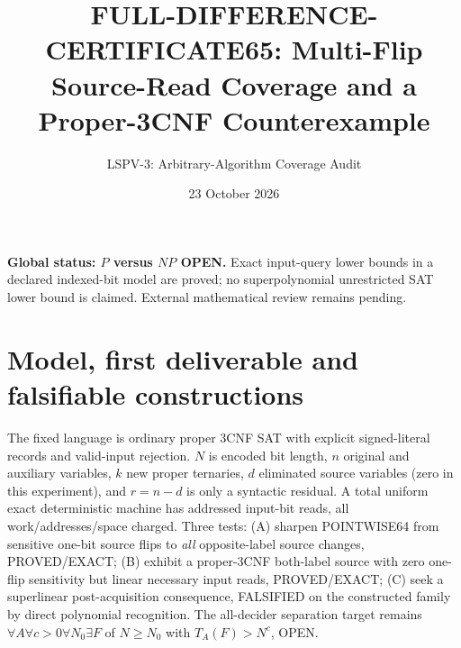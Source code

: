 \documentclass[10pt]{article}
\title{FULL-DIFFERENCE-CERTIFICATE65: Multi-Flip Source-Read Coverage and a Proper-3CNF Counterexample}
\author{LSPV-3: Arbitrary-Algorithm Coverage Audit}
\date{23 October 2026}
\begin{document}
\maketitle
\noindent\textbf{Global status: $P$ versus $NP$ OPEN.} Exact input-query lower bounds in a declared indexed-bit model are proved; no superpolynomial unrestricted SAT lower bound is claimed. External mathematical review remains pending.

\section{Model, first deliverable and falsifiable constructions}
The fixed language is ordinary proper 3CNF SAT with explicit signed-literal records and valid-input rejection. $N$ is encoded bit length, $n$ original and auxiliary variables, $k$ new proper ternaries, $d$ eliminated source variables (zero in this experiment), and $r=n-d$ is only a syntactic residual. A total uniform exact deterministic machine has addressed input-bit reads, all work/addresses/space charged. Three tests: (A) sharpen POINTWISE64 from sensitive one-bit source flips to \emph{all} opposite-label source changes, PROVED/EXACT; (B) exhibit a proper-3CNF both-label source with zero one-flip sensitivity but linear necessary input reads, PROVED/EXACT; (C) seek a superlinear post-acquisition consequence, FALSIFIED on the constructed family by direct polynomial recognition. The all-decider separation target remains $\forall A\forall c>0\forall N_0\exists F$ of $N\ge N_0$ with $T_A(F)>N^c$, OPEN.
\end{document}
